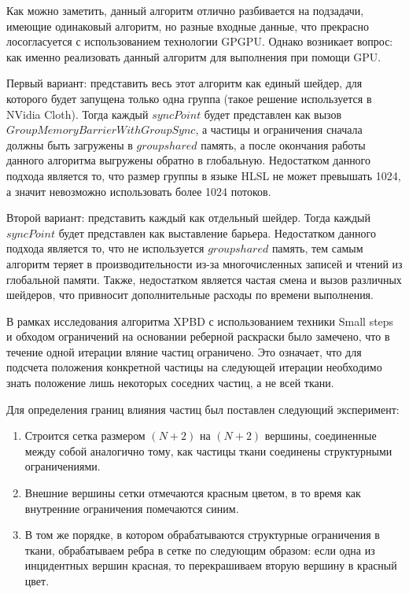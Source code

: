 	Как можно заметить, данный алгоритм отлично разбивается на подзадачи, имеющие одинаковый алгоритм, но разные входные данные, что прекрасно лосогласуется с использованием технологии GPGPU. Однако возникает вопрос: как именно реализовать данный алгоритм для выполнения при помощи GPU.
	
	Первый вариант: представить весь этот алгоритм как единый шейдер, для которого будет запущена только одна группа (такое решение используется в NVidia Cloth). Тогда каждый $syncPoint$ будет представлен как вызов $GroupMemoryBarrierWithGroupSync$, а частицы и ограничения сначала должны быть загружены в $groupshared$ память, а после окончания работы данного алгоритма выгружены обратно в глобальную. Недостатком данного подхода является то, что размер группы в языке HLSL не может превышать 1024, а значит невозможно использовать более 1024 потоков.
	
	Второй вариант: представить каждый  как отдельный шейдер. Тогда каждый $syncPoint$ будет представлен как выставление барьера. Недостатком данного подхода является то, что не используется $groupshared$ память, тем самым алгоритм теряет в производительности из-за многочисленных записей и чтений из глобальной памяти. Также, недостатком является частая смена и вызов различных шейдеров, что привносит дополнительные расходы по времени выполнения.
	
	В рамках исследования алгоритма XPBD с использованием техники Small steps и обходом ограничений на основании реберной раскраски было замечено, что в течение одной итерации вляние частиц ограничено. Это означает, что для подсчета положения конкретной частицы на следующей итерации необходимо знать положение лишь некоторых соседних частиц, а не всей ткани.
	
	Для определения границ влияния частиц был поставлен следующий эксперимент:
	\begin{enumerate}[1.]
		\item Строится сетка размером $(N+2)$ на $(N+2)$ вершины, соединенные между собой аналогично тому, как частицы ткани соединены структурными ограничениями.
		\item Внешние вершины сетки отмечаются красным цветом, в то время как внутренние ограничения помечаются синим.
		\item В том же порядке, в котором обрабатываются структурные ограничения в ткани, обрабатываем ребра в сетке по следующим образом: если одна из инцидентных вершин красная, то перекрашиваем вторую вершину в красный цвет.
	\end{enumerate}
	
